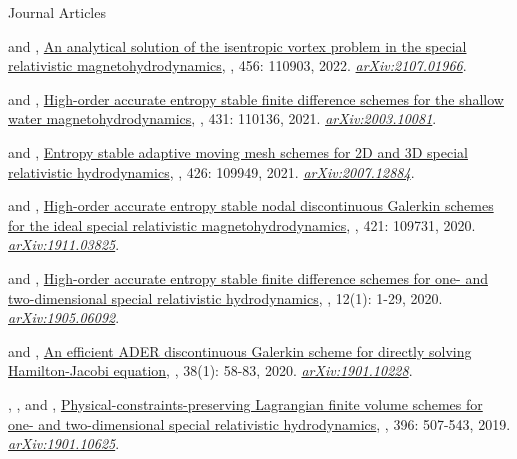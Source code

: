 \begin{cvpublicationsection}{Journal Articles}
%
\item[\pubenum]  and , \href{https://doi.org/10.1016/j.jcp.2021.110903}{An analytical solution of the isentropic vortex problem in the special relativistic magnetohydrodynamics}, , 456: 110903, 2022. \href{https://arxiv.org/abs/2107.01966}{\em arXiv:2107.01966}.
%
\item[\pubenum]  and , \href{https://doi.org/10.1016/j.jcp.2021.110136}{High-order accurate entropy stable finite difference schemes for the shallow water magnetohydrodynamics}, , 431: 110136, 2021. \href{https://arxiv.org/abs/2003.10081}{\em arXiv:2003.10081}.
%
\item[\pubenum]  and , \href{https://doi.org/10.1016/j.jcp.2020.109949}{Entropy stable adaptive moving mesh schemes for 2D and 3D special relativistic hydrodynamics}, , 426: 109949, 2021. \href{https://arxiv.org/abs/2007.12884}{\em arXiv:2007.12884}.
%
\item[\pubenum]  and , \href{https://doi.org/10.1016/j.jcp.2020.109731}{High-order accurate entropy stable nodal discontinuous Galerkin schemes for the ideal special relativistic magnetohydrodynamics}, , 421: 109731, 2020. \href{https://arxiv.org/abs/1911.03825}{\em arXiv:1911.03825}.
%
\item[\pubenum]  and , \href{https://doi.org/10.4208/aamm.OA-2019-0124}{High-order accurate entropy stable finite difference schemes for one- and two-dimensional special relativistic hydrodynamics}, , 12(1): 1-29, 2020. \href{https://arxiv.org/abs/1905.06092}{\em arXiv:1905.06092}.
%
\item[\pubenum]  and , \href{https://doi.org/10.4208/jcm.1902-m2018-0189}{An efficient ADER discontinuous Galerkin scheme for directly solving Hamilton-Jacobi equation}, , 38(1): 58-83, 2020. \href{https://arxiv.org/abs/1901.10228}{\em arXiv:1901.10228}.
%
\item[\pubenum] , , and , \href{https://doi.org/10.1016/j.jcp.2019.06.055}{Physical-constraints-preserving Lagrangian finite volume schemes for one- and two-dimensional special relativistic hydrodynamics}, , 396: 507-543, 2019. \href{https://arxiv.org/abs/1901.10625}{\em arXiv:1901.10625}.

\end{cvpublicationsection}
